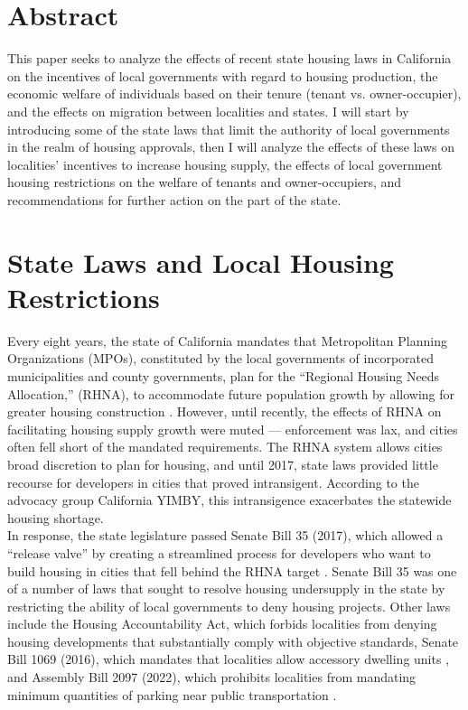\documentclass[12pt]{extarticle}
\title{}
\author{Avinash Iyer}
\date{}
\begin{document}
  \doublespacing
  \section*{Abstract}
  This paper seeks to analyze the effects of recent state housing laws in California on the incentives of local governments with regard to housing production, the economic welfare of individuals based on their tenure (tenant vs. owner-occupier), and the effects on migration between localities and states. I will start by introducing some of the state laws that limit the authority of local governments in the realm of housing approvals, then I will analyze the effects of these laws on localities' incentives to increase housing supply, the effects of local government housing restrictions on the welfare of tenants and owner-occupiers, and recommendations for further action on the part of the state.
  \section*{State Laws and Local Housing Restrictions}%
  Every eight years, the state of California mandates that Metropolitan Planning Organizations (MPOs), constituted by the local governments of incorporated municipalities and county governments, plan for the ``Regional Housing Needs Allocation,'' (RHNA), to accommodate future population growth by allowing for greater housing construction \cite{rhna}. However, until recently, the effects of RHNA on facilitating housing supply growth were muted --- enforcement was lax, and cities often fell short of the mandated requirements. The RHNA system allows cities broad discretion to plan for housing, and until 2017, state laws provided little recourse for developers in cities that proved intransigent. According to the advocacy group California YIMBY, this intransigence exacerbates the statewide housing shortage.\\

  In response, the state legislature passed Senate Bill 35 (2017), which allowed a ``release valve'' by creating a streamlined process for developers who want to build housing in cities that fell behind the RHNA target \cite{sb_35_423}. Senate Bill 35 was one of a number of laws that sought to resolve housing undersupply in the state by restricting the ability of local governments to deny housing projects. Other laws include the Housing Accountability Act, which forbids localities from denying housing developments that substantially comply with objective standards, Senate Bill 1069 (2016), which mandates that localities allow accessory dwelling units \cite{sb_1069}, and Assembly Bill 2097 (2022), which prohibits localities from mandating minimum quantities of parking near public transportation \cite{ab_2097}.
\end{document}
